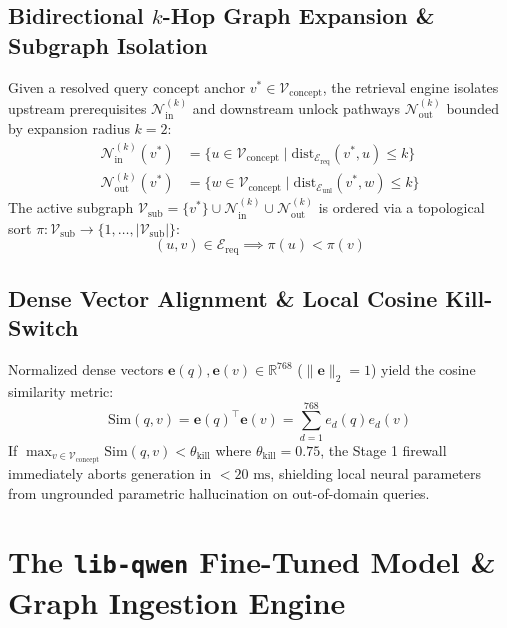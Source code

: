 \documentclass[10pt,a4paper]{article}
\begin{document}
\subsection{Bidirectional $k$-Hop Graph Expansion \& Subgraph Isolation}
Given a resolved query concept anchor $v^* \in \mathcal{V}_{\text{concept}}$, the retrieval engine isolates upstream prerequisites $\mathcal{N}_{\text{in}}^{(k)}$ and downstream unlock pathways $\mathcal{N}_{\text{out}}^{(k)}$ bounded by expansion radius $k=2$:
\begin{align}
\mathcal{N}_{\text{in}}^{(k)}(v^*) &= \{ u \in \mathcal{V}_{\text{concept}} \mid \text{dist}_{\mathcal{E}_{\text{req}}}(v^*, u) \le k \} \\
\mathcal{N}_{\text{out}}^{(k)}(v^*) &= \{ w \in \mathcal{V}_{\text{concept}} \mid \text{dist}_{\mathcal{E}_{\text{unl}}}(v^*, w) \le k \}
\end{align}
The active subgraph $\mathcal{V}_{\text{sub}} = \{v^*\} \cup \mathcal{N}_{\text{in}}^{(k)} \cup \mathcal{N}_{\text{out}}^{(k)}$ is ordered via a topological sort $\pi: \mathcal{V}_{\text{sub}} \to \{1, \dots, |\mathcal{V}_{\text{sub}}|\}$:
\begin{equation}
(u, v) \in \mathcal{E}_{\text{req}} \implies \pi(u) < \pi(v)
\end{equation}

\subsection{Dense Vector Alignment \& Local Cosine Kill-Switch}
Normalized dense vectors $\mathbf{e}(q), \mathbf{e}(v) \in \mathbb{R}^{768}$ ($\|\mathbf{e}\|_2 = 1$) yield the cosine similarity metric:
\begin{equation}
\text{Sim}(q, v) = \mathbf{e}(q)^\top \mathbf{e}(v) = \sum_{d=1}^{768} e_d(q) e_d(v)
\end{equation}
If $\max_{v \in \mathcal{V}_{\text{concept}}} \text{Sim}(q, v) < \theta_{\text{kill}}$ where $\theta_{\text{kill}} = 0.75$, the Stage 1 firewall immediately aborts generation in $<20\text{ ms}$, shielding local neural parameters from ungrounded parametric hallucination on out-of-domain queries.

\section{The \texttt{lib-qwen} Fine-Tuned Model \& Graph Ingestion Engine}
\end{document}
